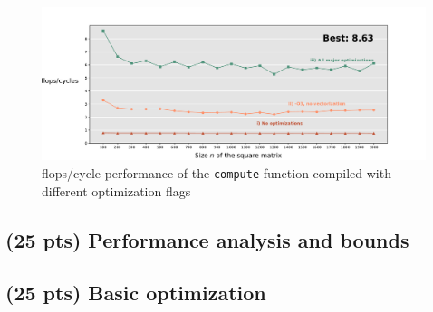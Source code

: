 \documentclass[tikz,14pt,fleqn]{article}
\begin{document}
\subsubsection{} %
\begin{figure}[H]
    \vspace*{-0.7cm}
    \includegraphics[width=\linewidth]{../out/ex2c.pdf}
    \caption{flops/cycle performance of the \texttt{compute} function compiled with different optimization flags}
\end{figure}


\subsubsection{} %


\subsection{(25 pts) Performance analysis and bounds}
\subsubsection{} %

\subsubsection{} %

\subsubsection{} %

\subsubsection{} %


\subsection{(25 pts) Basic optimization}
\end{document}
